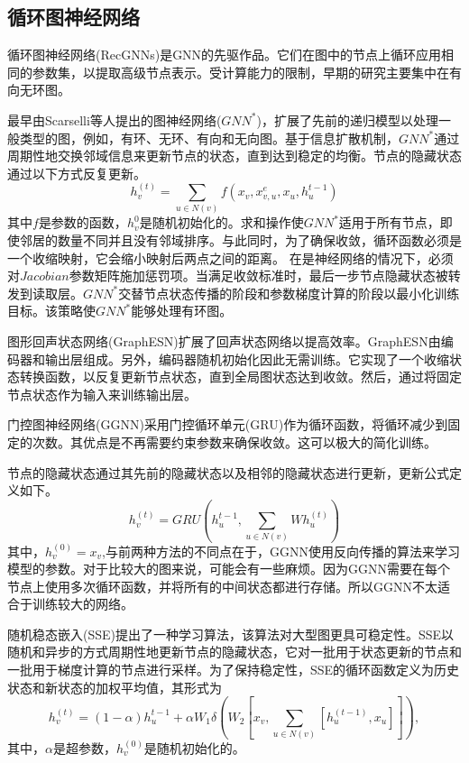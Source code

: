 \subsection{循环图神经网络}
循环图神经网络(RecGNNs)是GNN的先驱作品。它们在图中的节点上循环应用相同的参数集，以提取高级节点表示。受计算能力的限制，早期的研究主要集中在有向无环图。

最早由Scarselli等人提出的图神经网络($GNN^*$)\cite{scarselli2008graph}，扩展了先前的递归模型以处理一般类型的图，例如，有环、无环、有向和无向图。基于信息扩散机制，$GNN^*$通过周期性地交换邻域信息来更新节点的状态，直到达到稳定的均衡。节点的隐藏状态通过以下方式反复更新。
\[
h_v^{(t)}=\sum_{u\in N(v)}f(x_v,x^e_{v,u},x_u,h_u^{t-1})
\]
其中$f$是参数的函数，$h_v^{0}$是随机初始化的。求和操作使$GNN^*$适用于所有节点，即使邻居的数量不同并且没有邻域排序。与此同时，为了确保收敛，循环函数必须是一个收缩映射，它会缩小映射后两点之间的距离。
在是神经网络的情况下，必须对$Jacobian$参数矩阵施加惩罚项。当满足收敛标准时，最后一步节点隐藏状态被转发到读取层。$GNN^*$交替节点状态传播的阶段和参数梯度计算的阶段以最小化训练目标。该策略使$GNN^*$能够处理有环图。

图形回声状态网络(GraphESN)\cite{gallicchio2010graph}扩展了回声状态网络以提高效率。GraphESN由编码器和输出层组成。另外，编码器随机初始化因此无需训练。它实现了一个收缩状态转换函数，以反复更新节点状态，直到全局图状态达到收敛。然后，通过将固定节点状态作为输入来训练输出层。

门控图神经网络(GGNN)\cite{li2015gated}采用门控循环单元(GRU)作为循环函数，将循环减少到固定的次数。其优点是不再需要约束参数来确保收敛。这可以极大的简化训练。

节点的隐藏状态通过其先前的隐藏状态以及相邻的隐藏状态进行更新，更新公式定义如下。
\[
h_v^{(t)}=GRU(h_u^{t-1},\sum_{u\in N(v)} Wh_u^{(t)})
\]
其中，$h_v^{(0)}=x_v$,与前两种方法的不同点在于，GGNN使用反向传播的算法来学习模型的参数。对于比较大的图来说，可能会有一些麻烦。因为GGNN需要在每个节点上使用多次循环函数，并将所有的中间状态都进行存储。所以GGNN不太适合于训练较大的网络。

随机稳态嵌入(SSE)提出了一种学习算法，该算法对大型图更具可稳定性。SSE以随机和异步的方式周期性地更新节点的隐藏状态，它对一批用于状态更新的节点和一批用于梯度计算的节点进行采样。为了保持稳定性，SSE的循环函数定义为历史状态和新状态的加权平均值，其形式为
\[
h_v^{(t)}=(1-\alpha)h_u^{t-1}+\alpha W_1\delta(W_2[x_v,\sum_{u\in N(v)}[h_u^{(t-1)},x_u]]) ,
\]
其中，$\alpha$是超参数，$h_v^{(0)}$是随机初始化的。


